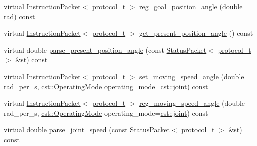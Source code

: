 \begin{DoxyCompactItemize}
\item 
virtual \hyperlink{classdynamixel_1_1_instruction_packet}{Instruction\+Packet}$<$ \hyperlink{classdynamixel_1_1servos_1_1_base_servo_ac484c11279ee2576a9a3bb8c940e0baf}{protocol\+\_\+t} $>$ \hyperlink{classdynamixel_1_1servos_1_1_base_servo_a5912ce58f8d174bcccd07ef75fef6a6b}{reg\+\_\+goal\+\_\+position\+\_\+angle} (double rad) const 
\item 
virtual \hyperlink{classdynamixel_1_1_instruction_packet}{Instruction\+Packet}$<$ \hyperlink{classdynamixel_1_1servos_1_1_base_servo_ac484c11279ee2576a9a3bb8c940e0baf}{protocol\+\_\+t} $>$ \hyperlink{classdynamixel_1_1servos_1_1_base_servo_a26a0ccb64fcefde496e1f45ed6462125}{get\+\_\+present\+\_\+position\+\_\+angle} () const 
\item 
virtual double \hyperlink{classdynamixel_1_1servos_1_1_base_servo_a235479ae2b41314f2d5f9492a1b09b44}{parse\+\_\+present\+\_\+position\+\_\+angle} (const \hyperlink{classdynamixel_1_1_status_packet}{Status\+Packet}$<$ \hyperlink{classdynamixel_1_1servos_1_1_base_servo_ac484c11279ee2576a9a3bb8c940e0baf}{protocol\+\_\+t} $>$ \&st) const 
\item 
virtual \hyperlink{classdynamixel_1_1_instruction_packet}{Instruction\+Packet}$<$ \hyperlink{classdynamixel_1_1servos_1_1_base_servo_ac484c11279ee2576a9a3bb8c940e0baf}{protocol\+\_\+t} $>$ \hyperlink{classdynamixel_1_1servos_1_1_base_servo_a5a976fa54ae637537b03596befcb7529}{set\+\_\+moving\+\_\+speed\+\_\+angle} (double rad\+\_\+per\+\_\+s, \hyperlink{namespacedynamixel_1_1servos_1_1cst_ac17b5608f65c6495114d34f8efc4d809}{cst\+::\+Operating\+Mode} operating\+\_\+mode=\hyperlink{namespacedynamixel_1_1servos_1_1cst_ac17b5608f65c6495114d34f8efc4d809a1fdfcfad31f04d24b25c0842e9d99c48}{cst\+::joint}) const 
\item 
virtual \hyperlink{classdynamixel_1_1_instruction_packet}{Instruction\+Packet}$<$ \hyperlink{classdynamixel_1_1servos_1_1_base_servo_ac484c11279ee2576a9a3bb8c940e0baf}{protocol\+\_\+t} $>$ \hyperlink{classdynamixel_1_1servos_1_1_base_servo_a2b9b43a25ff078a54031f58e752a177e}{reg\+\_\+moving\+\_\+speed\+\_\+angle} (double rad\+\_\+per\+\_\+s, \hyperlink{namespacedynamixel_1_1servos_1_1cst_ac17b5608f65c6495114d34f8efc4d809}{cst\+::\+Operating\+Mode} operating\+\_\+mode=\hyperlink{namespacedynamixel_1_1servos_1_1cst_ac17b5608f65c6495114d34f8efc4d809a1fdfcfad31f04d24b25c0842e9d99c48}{cst\+::joint}) const 
\item 
virtual double \hyperlink{classdynamixel_1_1servos_1_1_base_servo_a1fec786a4f11bd3febc4c6122e33cab5}{parse\+\_\+joint\+\_\+speed} (const \hyperlink{classdynamixel_1_1_status_packet}{Status\+Packet}$<$ \hyperlink{classdynamixel_1_1servos_1_1_base_servo_ac484c11279ee2576a9a3bb8c940e0baf}{protocol\+\_\+t} $>$ \&st) const 
\end{DoxyCompactItemize}


